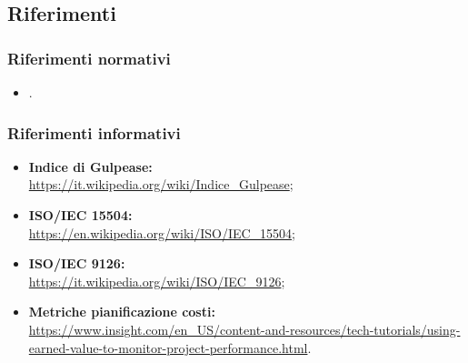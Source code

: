 \subsection{Riferimenti}

\subsubsection{Riferimenti normativi}
\begin{itemize}
	\item {}.
\end{itemize}

\subsubsection{Riferimenti informativi}
\sloppy
\begin{itemize}
	\item \textbf{Indice di Gulpease:}\\
	\url{https://it.wikipedia.org/wiki/Indice_Gulpease};
	\item \textbf{ISO/IEC 15504:}\\
	\url{https://en.wikipedia.org/wiki/ISO/IEC_15504};
	\item \textbf{ISO/IEC 9126:}\\
	\url{https://it.wikipedia.org/wiki/ISO/IEC_9126};
	\item \textbf{Metriche pianificazione costi:}\\
	\url{https://www.insight.com/en_US/content-and-resources/tech-tutorials/using-earned-value-to-monitor-project-performance.html}.
\end{itemize}
\fussy